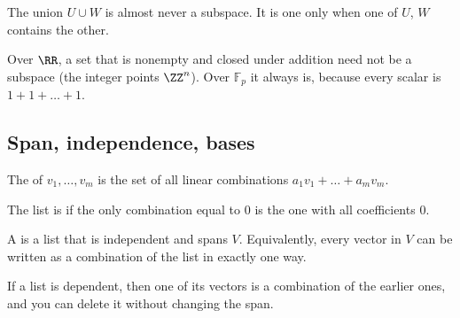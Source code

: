 \documentclass[11pt]{scrartcl}
\newcommand{\Fp}{\mathbb F_p}
\begin{document}
The union $U\cup W$ is almost never a subspace. It is one only when one of $U$, $W$ contains the other.

Over $\RR$, a set that is nonempty and closed under addition need not be a subspace (the integer points $\ZZ^n$). Over $\Fp$ it always is, because every scalar is $1+1+\dots+1$.

\subsection{Span, independence, bases}
\begin{definition*}
  The  of $v_1,\dots,v_m$ is the set of all linear combinations $a_1v_1+\dots+a_mv_m$.

  The list is  if the only combination equal to $0$ is the one with all coefficients $0$.

  A  is a list that is independent and spans $V$. Equivalently, every vector in $V$ can be written as a combination of the list in exactly one way.
\end{definition*}

\begin{proposition*}
  If a list is dependent, then one of its vectors is a combination of the earlier ones, and you can delete it without changing the span.
\end{proposition*}
\end{document}
